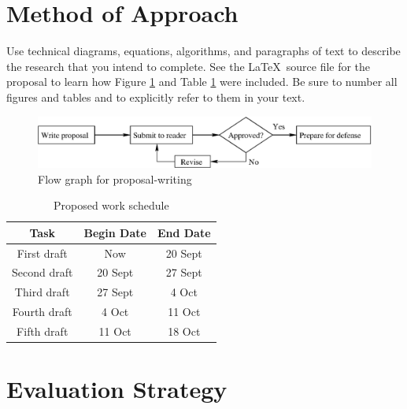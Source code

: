 \documentclass[11pt]{article}
\begin{document}
\section{Method of Approach}
\label{sec:method}
\vspace*{-.1in}


Use technical diagrams, equations, algorithms, and paragraphs of text
to describe the research that you intend to complete. See the \LaTeX\ source
file for the proposal to learn how Figure \ref{intro-fig1} and Table 
\ref{intro-tab1} were included. Be sure to number all figures and tables and to
explicitly refer to them in your text.

\begin{figure}[htbp]
\centering
\includegraphics[width=5in]{flow}
\caption{Flow graph for proposal-writing}
\label{intro-fig1}
\end{figure}

\begin{table}[htbp]
\centering
\begin{tabular}{|c||c|c|}
\hline
\bf Task & \bf Begin Date & \bf End Date\\\hline\hline
First draft & Now & 20 Sept\\\hline
Second draft & 20 Sept & 27 Sept\\\hline
Third draft & 27 Sept & 4 Oct\\\hline
Fourth draft & 4 Oct & 11 Oct\\\hline
Fifth draft & 11 Oct & 18 Oct\\\hline
\end{tabular}
\caption{Proposed work schedule}
\label{intro-tab1}
\end{table}

\vspace*{-.2in}
\section{Evaluation Strategy}
\label{sec:evaluate}
\vspace*{-.1in}
\end{document}
